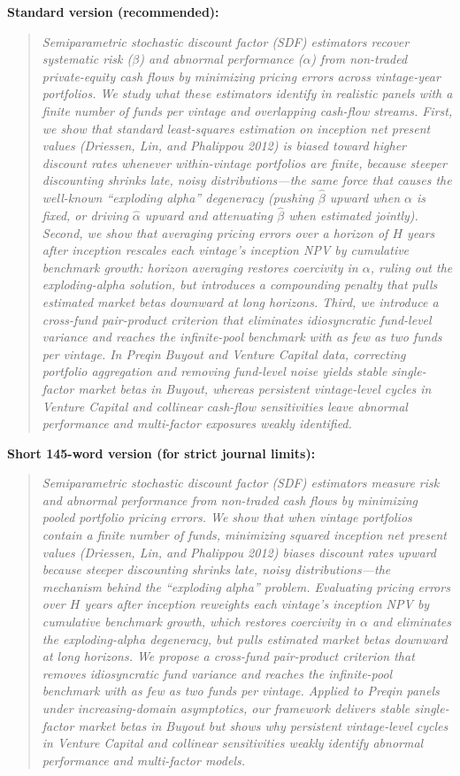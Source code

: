 \documentclass[11pt]{article}
\newenvironment{draft}{\begin{quote}\small\itshape}{\end{quote}}
\begin{document}
\textbf{Standard version (recommended):}
\begin{draft}
Semiparametric stochastic discount factor (SDF) estimators recover systematic risk ($\beta$) and abnormal performance ($\alpha$) from non-traded private-equity cash flows by minimizing pricing errors across vintage-year portfolios. We study what these estimators identify in realistic panels with a finite number of funds per vintage and overlapping cash-flow streams. First, we show that standard least-squares estimation on inception net present values (Driessen, Lin, and Phalippou 2012) is biased toward higher discount rates whenever within-vintage portfolios are finite, because steeper discounting shrinks late, noisy distributions—the same force that causes the well-known ``exploding alpha'' degeneracy (pushing $\hat\beta$ upward when $\alpha$ is fixed, or driving $\hat\alpha$ upward and attenuating $\hat\beta$ when estimated jointly). Second, we show that averaging pricing errors over a horizon of $H$ years after inception rescales each vintage's inception NPV by cumulative benchmark growth: horizon averaging restores coercivity in $\alpha$, ruling out the exploding-alpha solution, but introduces a compounding penalty that pulls estimated market betas downward at long horizons. Third, we introduce a cross-fund pair-product criterion that eliminates idiosyncratic fund-level variance and reaches the infinite-pool benchmark with as few as two funds per vintage. In Preqin Buyout and Venture Capital data, correcting portfolio aggregation and removing fund-level noise yields stable single-factor market betas in Buyout, whereas persistent vintage-level cycles in Venture Capital and collinear cash-flow sensitivities leave abnormal performance and multi-factor exposures weakly identified.
\end{draft}

\textbf{Short 145-word version (for strict journal limits):}
\begin{draft}
Semiparametric stochastic discount factor (SDF) estimators measure risk and abnormal performance from non-traded cash flows by minimizing pooled portfolio pricing errors. We show that when vintage portfolios contain a finite number of funds, minimizing squared inception net present values (Driessen, Lin, and Phalippou 2012) biases discount rates upward because steeper discounting shrinks late, noisy distributions—the mechanism behind the ``exploding alpha'' problem. Evaluating pricing errors over $H$ years after inception reweights each vintage's inception NPV by cumulative benchmark growth, which restores coercivity in $\alpha$ and eliminates the exploding-alpha degeneracy, but pulls estimated market betas downward at long horizons. We propose a cross-fund pair-product criterion that removes idiosyncratic fund variance and reaches the infinite-pool benchmark with as few as two funds per vintage. Applied to Preqin panels under increasing-domain asymptotics, our framework delivers stable single-factor market betas in Buyout but shows why persistent vintage-level cycles in Venture Capital and collinear sensitivities weakly identify abnormal performance and multi-factor models.
\end{draft}
\end{document}
